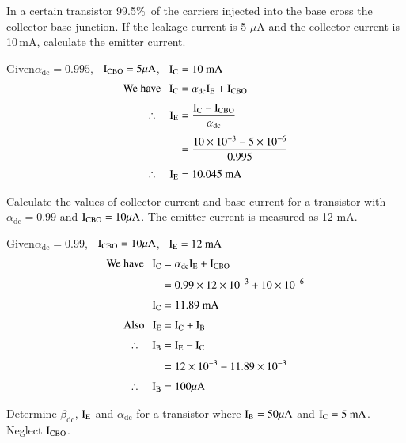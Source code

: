 \begin{problem}\label{prob2.3}
In a certain transistor 99.5\%\ of the carriers injected into the base cross the collector-base junction. If the leakage current is 5 $\mu$A and the collector current is 10\,mA, calculate the emitter current.
\end{problem}

\begin{solution}
Given\quad $\alpha_{\text{dc}}=0.995$, \ $\textrm{I}_{\text{CBO}}=5\mu\textrm{A}$, \ $\textrm{I}_{\textrm{C}}=10\text{~mA}$
\begin{align*}
\text{We have~~ } \textrm{I}_{\textrm{C}} &= \alpha_{\text{dc}}\textrm{I}_{\textrm{E}}+\textrm{I}_{\text{CBO}}\\[3pt]
\therefore\quad \textrm{I}_{\textrm{E}} &= \frac{\textrm{I}_{\textrm{C}}-\textrm{I}_{\text{CBO}}}{\alpha_{\text{dc}}}\\[3pt]
&= \frac{10\times 10^{-3}-5\times 10^{-6}}{0.995}\\[3pt]
\therefore\quad \textrm{I}_{\textrm{E}} &= 10.045\text{~mA}
\end{align*}
\end{solution}

\begin{problem}\label{prob2.4}
Calculate the values of collector current and base current for a transistor with $\alpha_{\text{dc}}=0.99$ and $\textrm{I}_{\text{CBO}}=10\mu\textrm{A}$. The emitter current is measured as 12 mA.
\end{problem}

\begin{solution}
Given\quad $\alpha_{\text{dc}}=0.99$, \ $\textrm{I}_{\text{CBO}}=10\mu\textrm{A}$, \ $\textrm{I}_{\textrm{E}}=12\text{~mA}$
\begin{align*}
\text{We have~~ } \textrm{I}_{\textrm{C}} &= \alpha_{\text{dc}}\textrm{I}_{\textrm{E}}+\textrm{I}_{\text{CBO}}\\[3pt]
&= 0.99\times 12\times 10^{-3}+10\times 10^{-6}\\[3pt]
\textrm{I}_{\textrm{C}} &= 11.89\text{~mA}\\[3pt]
\text{Also~~ } \textrm{I}_{\textrm{E}} &= \textrm{I}_{\textrm{C}}+\textrm{I}_{\textrm{B}}\\[3pt]
\therefore\quad \textrm{I}_{\textrm{B}} &= \textrm{I}_{\textrm{E}}- \textrm{I}_{\textrm{C}}\\[3pt]
&= 12\times 10^{-3}-11.89\times 10^{-3}\\[3pt]
\therefore\quad \textrm{I}_{\textrm{B}} &= 100\mu\textrm{A}
\end{align*}
\end{solution}

\begin{problem}\label{prob2.5}
Determine $\beta_{\text{dc}}$, $\textrm{I}_{\textrm{E}}$ and $\alpha_{\text{dc}}$ for a transistor where $\textrm{I}_{\textrm{B}}=50\mu\textrm{A}$ and $\textrm{I}_{\textrm{C}}=5\text{~mA}$. Neglect $\textrm{I}_{\text{CBO}}$.
\end{problem}

